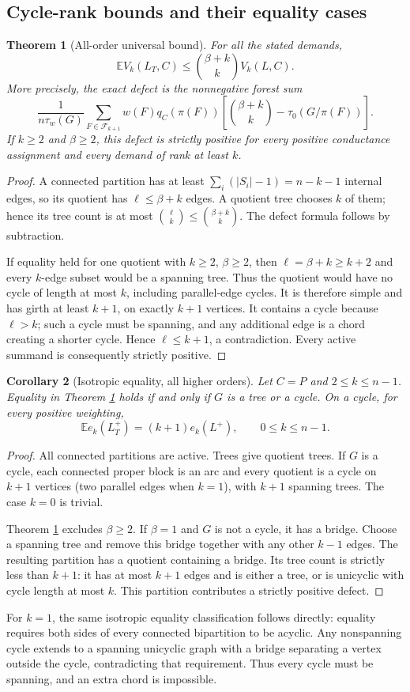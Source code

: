 \documentclass[11pt,a4paper]{article}
\newtheorem{theorem}{Theorem}[section]
\newtheorem{corollary}[theorem]{Corollary}
\theoremstyle{definition}\newtheorem{definition}[theorem]{Definition}
\theoremstyle{remark}\newtheorem{remark}[theorem]{Remark}
\numberwithin{equation}{section}
\begin{document}
\subsection{Cycle-rank bounds and their equality cases}\label{T09-sec-3}
\begin{theorem}[All-order universal bound]\label{T09-bound}
For all the stated demands,
\[
 \mathbb E V_k(L_T,C)\le \binom{\beta+k}{k}V_k(L,C).
\]
More precisely, the exact defect is the nonnegative forest sum
\[
 \frac1{n\tau_w(G)}\sum_{F\in\mathcal F_{k+1}}w(F)q_C(\pi(F))
 \left[\binom{\beta+k}{k}-\tau_0(G/\pi(F))\right].
\]
If $k\ge2$ and $\beta\ge2$, this defect is strictly positive for every positive conductance assignment and every demand of rank at least $k$.
\end{theorem}
\begin{proof}
A connected partition has at least $\sum_i(|S_i|-1)=n-k-1$ internal edges, so its quotient has $\ell\le\beta+k$ edges. A quotient tree chooses $k$ of them; hence its tree count is at most $\binom{\ell}{k}\le\binom{\beta+k}{k}$. The defect formula follows by subtraction.

If equality held for one quotient with $k\ge2$, $\beta\ge2$, then $\ell=\beta+k\ge k+2$ and every $k$-edge subset would be a spanning tree. Thus the quotient would have no cycle of length at most $k$, including parallel-edge cycles. It is therefore simple and has girth at least $k+1$, on exactly $k+1$ vertices. It contains a cycle because $\ell>k$; such a cycle must be spanning, and any additional edge is a chord creating a shorter cycle. Hence $\ell\le k+1$, a contradiction. Every active summand is consequently strictly positive.
\end{proof}
\begin{corollary}[Isotropic equality, all higher orders]\label{T09-eq}
Let $C=P$ and $2\le k\le n-1$. Equality in Theorem \ref{T09-bound} holds if and only if $G$ is a tree or a cycle. On a cycle, for every positive weighting,
\[
 \mathbb E e_k(L_T^+)=(k+1)e_k(L^+),\qquad 0\le k\le n-1.
\]
\end{corollary}
\begin{proof}
All connected partitions are active. Trees give quotient trees. If $G$ is a cycle, each connected proper block is an arc and every quotient is a cycle on $k+1$ vertices (two parallel edges when $k=1$), with $k+1$ spanning trees. The case $k=0$ is trivial.

Theorem \ref{T09-bound} excludes $\beta\ge2$. If $\beta=1$ and $G$ is not a cycle, it has a bridge. Choose a spanning tree and remove this bridge together with any other $k-1$ edges. The resulting partition has a quotient containing a bridge. Its tree count is strictly less than $k+1$: it has at most $k+1$ edges and is either a tree, or is unicyclic with cycle length at most $k$. This partition contributes a strictly positive defect.
\end{proof}
For $k=1$, the same isotropic equality classification follows directly: equality requires both sides of every connected bipartition to be acyclic. Any nonspanning cycle extends to a spanning unicyclic graph with a bridge separating a vertex outside the cycle, contradicting that requirement. Thus every cycle must be spanning, and an extra chord is impossible.
\end{document}
